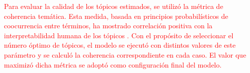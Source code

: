 \documentclass[11pt,a4paper]{article}
\begin{document}
	\textcolor{red}{Para evaluar la calidad de los tópicos estimados, se utilizó la métrica de coherencia temática. Esta medida, basada en principios probabilísticos de coocurrencia entre términos, ha mostrado correlación positiva con la interpretabilidad humana de los tópicos \cite{Rder2015}. Con el propósito de seleccionar el número óptimo de tópicos, el modelo se ejecutó con distintos valores de este parámetro y se calculó la coherencia correspondiente en cada caso. El valor que maximizó dicha métrica se adoptó como configuración final del modelo.}
%	
%	
%	
%	
%	
%	
%	
\end{document}
